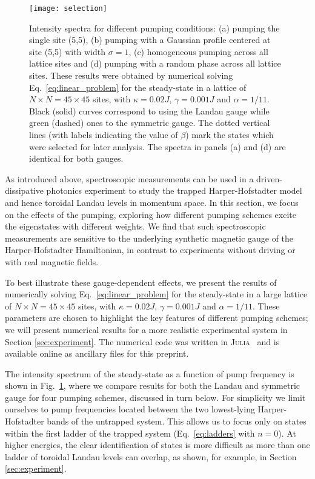 \documentclass[twocolumn, 10pt, aps, superscriptaddress, floatfix, showpacs, pra, citeautoscript]{revtex4-1}
\begin{document}
\begin{figure}[tb]\centering
  \texttt{[image: selection]} %
  \caption{Intensity spectra for different pumping conditions: (a)
    pumping the single site (5,5), (b) pumping with a Gaussian
    profile centered at site (5,5) with width $\sigma=1$, (c) homogeneous pumping across all lattice sites and (d) pumping with a random
    phase across all lattice sites. These results were obtained by numerical solving Eq.~\eqref{eq:linear_problem} for the steady-state in a lattice of
$N \times N = 45 \times 45$ sites, with $\kappa = 0.02 J$,
$\gamma = 0.001 J$ and $\alpha = 1/11$.   
    Black (solid) curves correspond to using the Landau gauge while
    green (dashed) ones to the symmetric gauge. The dotted vertical
    lines (with labels indicating the value of $\beta$) mark the
    states which were selected for later analysis. The spectra in
    panels (a) and (d) are identical for both gauges.}
  \label{fig:pumping_schemes}
\end{figure}

As introduced above, spectroscopic measurements can be used in a driven-dissipative photonics experiment to study the trapped Harper-Hofstadter model and hence toroidal Landau levels in momentum space. In this section, we focus on the effects of the pumping, exploring how different pumping schemes excite the eigenstates with different weights. We find that such spectroscopic measurements are sensitive to the underlying synthetic magnetic gauge of the Harper-Hofstadter Hamiltonian, in contrast to experiments without driving or with real magnetic fields. 

To best illustrate these gauge-dependent effects, we present the results of numerically solving
Eq.~\eqref{eq:linear_problem} for the steady-state in a large lattice of
$N \times N = 45 \times 45$ sites, with $\kappa = 0.02 J$,
$\gamma = 0.001 J$ and $\alpha = 1/11$.  These parameters are chosen to highlight the key features of different pumping schemes; we will present numerical results for a more realistic experimental system in Section \ref{sec:experiment}.  The numerical code was written
in \textsc{Julia}~\cite{bezanson2014julia} and is available online as ancillary
files for this preprint. 

The intensity spectrum of the steady-state as a function of pump
frequency is shown in Fig.~\ref{fig:pumping_schemes}, where we compare results for both the Landau and symmetric gauge for four pumping
schemes, discussed in turn below. For simplicity we limit ourselves to pump frequencies located between the two lowest-lying Harper-Hofstadter bands of the untrapped system. This allows us to focus only on states within the first ladder of the trapped system (Eq.~\eqref{eq:ladders} with $n = 0$). At higher energies, the clear identification of states is more difficult as more than one ladder of toroidal Landau levels can overlap, as shown, for example, in Section \ref{sec:experiment}. 
\end{document}
